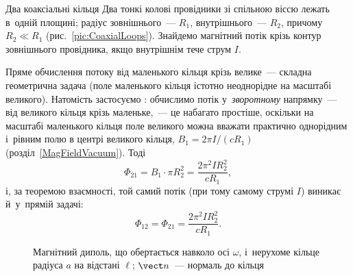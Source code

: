 \begin{Example}{Два коаксіальні кільця}
	Два тонкі колові провідники зі спільною віссю лежать в~одній площині; радіус
	зовнішнього~--- $R_1$, внутрішнього~--- $R_2$, причому $R_2\ll R_1$
	(рис.~\ref{pic:CoaxialLoops}). Знайдемо магнітний потік крізь контур зовнішнього
	провідника, якщо внутрішнім тече струм $I$.

	Пряме обчислення потоку від маленького кільця крізь велике~--- складна геометрична
	задача (поле маленького кільця істотно неоднорідне на масштабі великого). Натомість
	застосуємо : обчислимо потік у~\emph{зворотному}
	напрямку~--- від великого кільця крізь маленьке,~--- це набагато простіше, оскільки на
	масштабі маленького кільця поле великого можна вважати практично однорідним і~рівним
	полю в центрі великого кільця, $B_1 = 2\pi I/(cR_1)$ (розділ~\ref{MagFieldVacuum}). Тоді
	\begin{equation*}
		\Phi_{21} = B_1\cdot \pi R_2^2 = \frac{2\pi^2 I R_2^2}{cR_1},
	\end{equation*}
	і, за теоремою взаємності, той самий потік (при тому самому струмі $I$) виникає
	й~у~прямій задачі:
	\begin{equation*}
		\Phi_{12} = \Phi_{21} = \frac{2\pi^2 I R_2^2}{cR_1}.
	\end{equation*}
\end{Example}

\begin{figure}[tbp]\centering
	\caption{Магнітний диполь, що обертається навколо осі $\omega$, і~нерухоме кільце радіуса $a$ на відстані $\ell$; $\vect n$~--- нормаль до кільця\label{pic:RotatingDipole}}
\end{figure}

